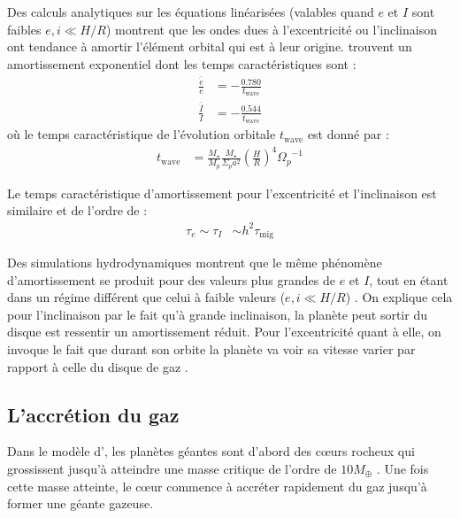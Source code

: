 Des calculs analytiques sur les équations linéarisées (valables quand $e$ et $I$ sont faibles $e,i \ll H/R$) montrent que les ondes dues à l'excentricité ou l'inclinaison ont tendance à amortir l'élément orbital qui est à leur origine. \cite[eqs. (45), (47)]{tanaka2004three} trouvent un amortissement exponentiel dont les temps caractéristiques sont : 
\begin{subequations}
\begin{align}
\frac{\overline{\dot{e}}}{e} &= -\frac{0.780}{t_\text{wave}}\\
\frac{\overline{\dot{I}}}{I} &= -\frac{0.544}{t_\text{wave}}
\end{align}
\end{subequations}
où le temps caractéristique de l'évolution orbitale $t_\text{wave}$ est donné par \cite[eq. (49)]{tanaka2004three} :
\begin{align}
t_\text{wave} &= \frac{M_\star}{M_p}\frac{M_\star}{\Sigma_p a^2} \left(\frac{H}{R}\right)^4 {\Omega_p}^{-1}
\end{align}

Le temps caractéristique d'amortissement pour l'excentricité et l'inclinaison est similaire et de l'ordre de \citep{tanaka2004three} :
\begin{align}
\tau_e \sim \tau_I &\sim h^2 \tau_\text{mig}
\end{align}

Des simulations hydrodynamiques montrent que le même phénomène d'amortissement se produit pour des valeurs plus grandes de $e$ et $I$, tout en étant dans un régime différent que celui à faible valeurs ($e,i \ll H/R$) \citep{cresswell2007evolution}. On explique cela pour l'inclinaison par le fait qu'à grande inclinaison, la planète peut sortir du disque est ressentir un amortissement réduit. Pour l'excentricité quant à elle, on invoque le fait que durant son orbite la planète va voir sa vitesse varier par rapport à celle du disque de gaz \citep{papaloizou2000orbital}.

\subsection{L'accrétion du gaz}\label{sec:accretion_coeur}
Dans le modèle d', les planètes géantes sont d'abord des cœurs rocheux qui grossissent jusqu'à atteindre une masse critique de l'ordre de $10 M_{\oplus}$ \citep{pollack1996formation}. Une fois cette masse atteinte, le cœur commence à accréter rapidement du gaz jusqu'à former une géante gazeuse.

